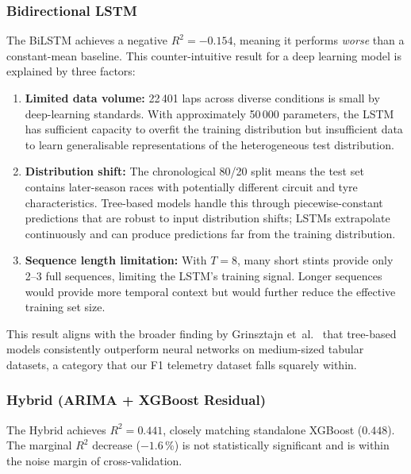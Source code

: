 \documentclass[journal,twoside]{IEEEtran}
\begin{document}
\subsubsection{Bidirectional LSTM}

The BiLSTM achieves a negative $R^{2} = -0.154$, meaning it performs
\emph{worse} than a constant-mean baseline.  This counter-intuitive
result for a deep learning model is explained by three factors:

\begin{enumerate}
  \item \textbf{Limited data volume:}  22\,401 laps across diverse
  conditions is small by deep-learning standards.  With approximately
  50\,000 parameters, the LSTM has sufficient capacity to overfit the
  training distribution but insufficient data to learn generalisable
  representations of the heterogeneous test distribution.

  \item \textbf{Distribution shift:}  The chronological 80/20 split
  means the test set contains later-season races with potentially
  different circuit and tyre characteristics.  Tree-based models handle
  this through piecewise-constant predictions that are robust to input
  distribution shifts; LSTMs extrapolate continuously and can produce
  predictions far from the training distribution.

  \item \textbf{Sequence length limitation:}  With $T=8$, many short
  stints provide only 2--3 full sequences, limiting the LSTM's
  training signal.  Longer sequences would provide more temporal
  context but would further reduce the effective training set size.
\end{enumerate}

This result aligns with the broader finding by Grinsztajn
et~al.~\cite{grinsztajn2022tree} that tree-based models consistently
outperform neural networks on medium-sized tabular datasets, a
category that our F1 telemetry dataset falls squarely within.

\subsubsection{Hybrid (ARIMA + XGBoost Residual)}

The Hybrid achieves $R^{2}=0.441$, closely matching standalone XGBoost
($0.448$).  The marginal $R^{2}$ decrease ($-1.6\,\%$) is not
statistically significant and is within the noise margin of
cross-validation.
\end{document}
